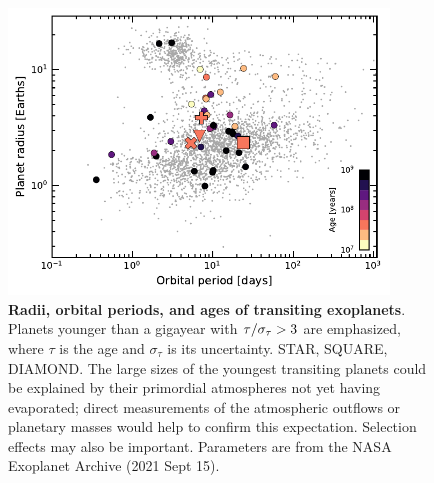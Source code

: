 \documentclass[12pt,modern,tighten]{aastex63}
\begin{document}
\begin{figure}[!t]
	\begin{center}
		\leavevmode
		\includegraphics[width=0.9\textwidth]{f4.pdf}
	\end{center}
	\vspace{-0.7cm}
	\caption{
		{\bf Radii, orbital periods, and ages of transiting exoplanets}.
		Planets younger than a gigayear with ${\rm \tau}/\sigma_{\tau} >
		3$ are emphasized, where $\tau$ is the age and $\sigma_{\tau}$ is
		its uncertainty. STAR, SQUARE, DIAMOND.  The large sizes of
		the youngest transiting planets could be explained by their
		primordial atmospheres not yet having evaporated; direct
		measurements of the atmospheric outflows or planetary masses would
		help to confirm this expectation.  Selection effects may also be
		important.  Parameters are from the NASA Exoplanet Archive (2021
		Sept 15).
		\label{fig:rp_period_age}
	}
\end{figure}


\end{document}
